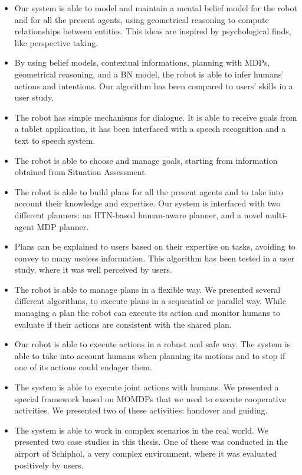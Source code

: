 \begin{itemize}
\item Our system is able to model and maintain a mental belief model for the robot and for all the present agents, using geometrical reasoning to compute relationships between entities. This ideas are inspired by psychological finds, like perspective taking.
\item By using belief models, contextual informations, planning with MDPs,  geometrical reasoning, and a BN model, the robot is able to infer humans' actions and intentions. Our algorithm has been compared to users' skills in a user study.
\item The robot has simple mechanisms for dialogue. It is able to receive goals from a tablet application, it has been interfaced with a speech recognition and a text to speech system.
\item The robot is able to choose and manage goals, starting from information obtained from Situation Assessment.
\item The robot is able to build plans for all the present agents and to take into account their knowledge and expertise. Our system is interfaced with two different planners: an HTN-based human-aware planner, and a novel multi-agent MDP planner.
\item Plans can be explained to users based on their expertise on tasks, avoiding to convey to many useless information. This algorithm has been tested in a user study, where it was well perceived by users.
\item The robot is able to manage plans in a flexible way. We presented several different algorithms, to execute plans in a sequential or parallel way. While managing a plan the robot can execute its action and monitor humans to evaluate if their actions are consistent with the shared plan.
\item Our robot is able to execute actions in a robust and safe way. The system is able to take into account humans when planning its motions and to stop if one of its actions could endager them.
\item The system is able to execute joint actions with humans. We presented a special framework based on MOMDPs that we used to execute cooperative activities. We presented two of these activities: handover and guiding.
\item The system is able to work in complex scenarios in the real world. We presented two case studies in this thesis. One of these was conducted in the airport of Schiphol, a very complex environment, where it was evaluated positively by users.
\end{itemize}



